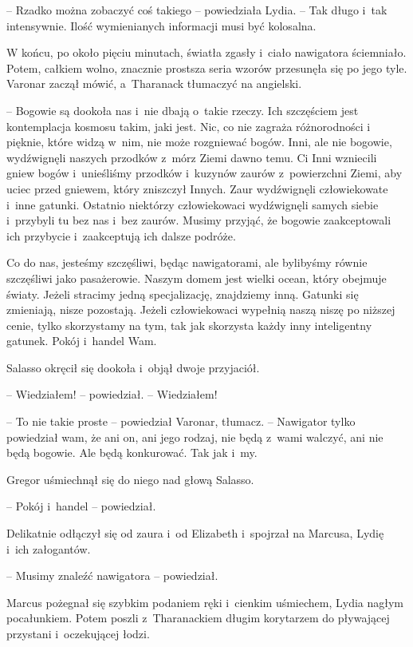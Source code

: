 \documentclass[oneside,polish,12pt,sfheadings]{mwbk}
\begin{document}
-- Rzadko można zobaczyć coś takiego -- powiedziała Lydia. -- Tak długo i~tak intensywnie. Ilość wymienianych informacji musi być kolosalna.

W końcu, po około pięciu minutach, światła zgasły i~ciało nawigatora
ściemniało. Potem, całkiem wolno, znacznie prostsza seria wzorów
przesunęła się po jego tyle. Varonar zaczął mówić, a~Tharanack tłumaczyć
na angielski.

-- Bogowie są dookoła nas i~nie dbają o~takie rzeczy. Ich szczęściem jest
kontemplacja kosmosu takim, jaki jest. Nic, co nie zagraża różnorodności
i pięknie, które widzą w~nim, nie może rozgniewać bogów. Inni, ale nie
bogowie, wydźwignęli naszych przodków z~mórz Ziemi dawno temu. Ci Inni
wzniecili gniew bogów i~unieśliśmy przodków i~kuzynów zaurów z~powierzchni Ziemi, aby uciec przed gniewem, który zniszczył Innych. Zaur
wydźwignęli człowiekowate i~inne gatunki. Ostatnio niektórzy
człowiekowaci wydźwignęli samych siebie i~przybyli tu bez nas i~bez
zaurów. Musimy przyjąć, że bogowie zaakceptowali ich przybycie i~zaakceptują ich dalsze podróże.

Co do nas, jesteśmy szczęśliwi, będąc nawigatorami, ale bylibyśmy równie
szczęśliwi jako pasażerowie. Naszym domem jest wielki ocean, który
obejmuje światy. Jeżeli stracimy jedną specjalizację, znajdziemy inną.
Gatunki się zmieniają, nisze pozostają. Jeżeli człowiekowaci wypełnią
naszą niszę po niższej cenie, tylko skorzystamy na tym, tak jak
skorzysta każdy inny inteligentny gatunek. Pokój i~handel Wam.

Salasso okręcił się dookoła i~objął dwoje przyjaciół.

-- Wiedziałem! -- powiedział. -- Wiedziałem!

-- To nie takie proste -- powiedział Varonar, tłumacz. -- Nawigator tylko
powiedział wam, że ani on, ani jego rodzaj, nie będą z~wami walczyć, ani
nie będą bogowie. Ale będą konkurować. Tak jak i~my.

Gregor uśmiechnął się do niego nad głową Salasso.

-- Pokój i~handel -- powiedział.

Delikatnie odłączył się od zaura i~od Elizabeth i~spojrzał na Marcusa,
Lydię i~ich załogantów.

-- Musimy znaleźć nawigatora -- powiedział.

Marcus pożegnał się szybkim podaniem ręki i~cienkim uśmiechem, Lydia
nagłym pocałunkiem. Potem poszli z~Tharanackiem długim korytarzem do
pływającej przystani i~oczekującej łodzi.
\end{document}
